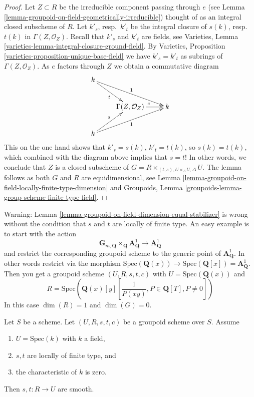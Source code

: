 \begin{proof}
Let $Z \subset R$ be the irreducible component passing through $e$ (see
Lemma \ref{lemma-groupoid-on-field-geometrically-irreducible})
thought of as an integral closed subscheme of $R$.
Let $k'_s$, resp.\ $k'_t$ be the integral closure of
$s(k)$, resp.\ $t(k)$ in $\Gamma(Z, \mathcal{O}_Z)$.
Recall that $k'_s$ and $k'_t$ are fields, see
Varieties, Lemma \ref{varieties-lemma-integral-closure-ground-field}.
By
Varieties, Proposition \ref{varieties-proposition-unique-base-field}
we have $k'_s = k'_t$ as subrings of $\Gamma(Z, \mathcal{O}_Z)$.
As $e$ factors through $Z$ we obtain a commutative diagram
$$
\xymatrix{
k \ar[rd]_t \ar[rrd]^1 \\
& \Gamma(Z, \mathcal{O}_Z) \ar[r]^e & k \\
k \ar[ru]^s \ar[rru]_1
}
$$
This on the one hand shows that $k'_s = s(k)$, $k'_t = t(k)$, so
$s(k) = t(k)$, which combined with the diagram above implies
that $s = t$! In other words, we conclude that $Z$ is a closed
subscheme of $G = R \times_{(t, s), U \times_S U, \Delta} U$.
The lemma follows as both $G$ and $R$ are equidimensional, see
Lemma \ref{lemma-groupoid-on-field-locally-finite-type-dimension} and
Groupoids, Lemma \ref{groupoids-lemma-group-scheme-finite-type-field}.
\end{proof}

\begin{remark}
\label{remark-warn-dimension-groupoid-on-field}
Warning:
Lemma \ref{lemma-groupoid-on-field-dimension-equal-stabilizer}
is wrong without the condition that $s$ and $t$ are locally of
finite type.
An easy example is to start with the action
$$
\mathbf{G}_{m, \mathbf{Q}} \times_{\mathbf{Q}} \mathbf{A}^1_{\mathbf{Q}}
\to \mathbf{A}^1_{\mathbf{Q}}
$$
and restrict the corresponding groupoid scheme to the generic point of
$\mathbf{A}^1_{\mathbf{Q}}$. In other words restrict via the morphism
$\text{Spec}(\mathbf{Q}(x)) \to
\text{Spec}(\mathbf{Q}[x]) = \mathbf{A}^1_{\mathbf{Q}}$.
Then you get a groupoid scheme
$(U, R, s, t, c)$ with
$U = \text{Spec}(\mathbf{Q}(x))$
and
$$
R = \text{Spec}\left(
\mathbf{Q}(x)[y]\left[
\frac{1}{P(xy)}, P \in \mathbf{Q}[T], P \not = 0
\right]
\right)
$$
In this case $\dim(R) = 1$ and $\dim(G) = 0$.
\end{remark}

\begin{lemma}
\label{lemma-groupoid-characteristic-zero-smooth}
Let $S$ be a scheme. Let $(U, R, s, t, c)$ be a groupoid scheme
over $S$. Assume
\begin{enumerate}
\item $U = \text{Spec}(k)$ with $k$ a field,
\item $s, t$ are locally of finite type, and
\item the characteristic of $k$ is zero.
\end{enumerate}
Then $s, t : R \to U$ are smooth.
\end{lemma}

